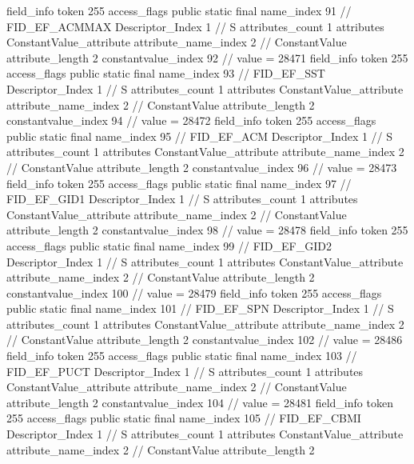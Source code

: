{{{{{{{				}
				}
			}
			field_info {
				token	255
				access_flags	public static final
				name_index	91		// FID_EF_ACMMAX
				Descriptor_Index	1		// S
				attributes_count	1
				attributes {
				ConstantValue_attribute {
					attribute_name_index	2		// ConstantValue
					attribute_length	2
					constantvalue_index	92		// value = 28471
				}
				}
			}
			field_info {
				token	255
				access_flags	public static final
				name_index	93		// FID_EF_SST
				Descriptor_Index	1		// S
				attributes_count	1
				attributes {
				ConstantValue_attribute {
					attribute_name_index	2		// ConstantValue
					attribute_length	2
					constantvalue_index	94		// value = 28472
				}
				}
			}
			field_info {
				token	255
				access_flags	public static final
				name_index	95		// FID_EF_ACM
				Descriptor_Index	1		// S
				attributes_count	1
				attributes {
				ConstantValue_attribute {
					attribute_name_index	2		// ConstantValue
					attribute_length	2
					constantvalue_index	96		// value = 28473
				}
				}
			}
			field_info {
				token	255
				access_flags	public static final
				name_index	97		// FID_EF_GID1
				Descriptor_Index	1		// S
				attributes_count	1
				attributes {
				ConstantValue_attribute {
					attribute_name_index	2		// ConstantValue
					attribute_length	2
					constantvalue_index	98		// value = 28478
				}
				}
			}
			field_info {
				token	255
				access_flags	public static final
				name_index	99		// FID_EF_GID2
				Descriptor_Index	1		// S
				attributes_count	1
				attributes {
				ConstantValue_attribute {
					attribute_name_index	2		// ConstantValue
					attribute_length	2
					constantvalue_index	100		// value = 28479
				}
				}
			}
			field_info {
				token	255
				access_flags	public static final
				name_index	101		// FID_EF_SPN
				Descriptor_Index	1		// S
				attributes_count	1
				attributes {
				ConstantValue_attribute {
					attribute_name_index	2		// ConstantValue
					attribute_length	2
					constantvalue_index	102		// value = 28486
				}
				}
			}
			field_info {
				token	255
				access_flags	public static final
				name_index	103		// FID_EF_PUCT
				Descriptor_Index	1		// S
				attributes_count	1
				attributes {
				ConstantValue_attribute {
					attribute_name_index	2		// ConstantValue
					attribute_length	2
					constantvalue_index	104		// value = 28481
				}
				}
			}
			field_info {
				token	255
				access_flags	public static final
				name_index	105		// FID_EF_CBMI
				Descriptor_Index	1		// S
				attributes_count	1
				attributes {
				ConstantValue_attribute {
					attribute_name_index	2		// ConstantValue
					attribute_length	2
}}}}}}}
